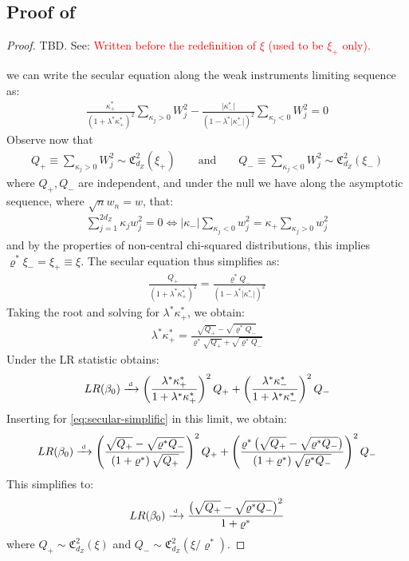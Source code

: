 \subsection{Proof of}
\begin{proof}
    TBD. See: \textcolor{red}{Written before the redefinition of \(\xi\) (used to be \(\xi_+\) only). }

    we can write the secular equation along the weak instruments limiting sequence as:
\begin{align*}
    \frac{ \kappa_+^* }{(1+\lambda^*\kappa^*_+)^2}\sum_{\kappa_j>0}W_{j}^2 
    -\frac{ \lvert\kappa_-^*\rvert }{(1-\lambda^*\lvert\kappa_-^*\rvert)^2}\sum_{\kappa_j<0}W_{j}^2  = 0
\end{align*}
Observe now that
\begin{align}
    Q_+ \equiv \sum_{\kappa_j>0}W_j^2 \sim \mathfrak{C}^2_{d_Z}(\xi_+)
    \qquad \text{and}
    \qquad 
    Q_- \equiv \sum_{\kappa_j<0}W_j^2 \sim \mathfrak{C}^2_{d_Z}(\xi_-)
\end{align}
where \(Q_+,Q_-\) are independent, and under the null we have along the asymptotic sequence, where \(\sqrt{n}w_n=w\), that:
\begin{align*}
    \sum_{j=1}^{2d_Z}\kappa_jw_j^2 = 0
    \iff
        \lvert\kappa_-\rvert\sum_{\kappa_j<0}w_j^2 = \kappa_+\sum_{\kappa_j>0}w_j^2
\end{align*}
and by the properties of non-central chi-squared distributions, this implies \(\varrho^*\xi_- = \xi_+ \equiv \xi\).
The secular equation thus simplifies as:
\begin{align*}
    \frac{ Q_+ }{(1+\lambda^*\kappa^*_+)^2}
     = \frac{ \varrho^* Q_- }{(1-\lambda^*\lvert\kappa_-^*\rvert)^2} 
\end{align*}
Taking the root and solving for \(\lambda^*\kappa_+^*\), we obtain:
\begin{align*}
\lambda^*\kappa_+^* = 
    \frac{ \sqrt{Q_+}-\sqrt{\varrho^*Q_-}}{\varrho^*\sqrt{Q_+} + \sqrt{\varrho^*Q_-}}
    \label{eq:secular-simplific}
\end{align*}
Under  the LR statistic obtains:
\begin{align*}
    LR(\beta_0) \xrightarrow{{\scriptscriptstyle \mathrm{\;d\;}}} 
     \left(\frac{\lambda^*  \kappa^*_+}{1+\lambda^* \kappa^*_+}\right)^2Q_++\left(\frac{\lambda^*  \kappa^*_-}{1+\lambda^* \kappa^*_-}\right)^2Q_- 
\end{align*}
Inserting for \cref{eq:secular-simplific} in this limit, we obtain:
\begin{align*}
    LR(\beta_0) \xrightarrow{{\scriptscriptstyle \mathrm{\;d\;}}} 
     \left(\frac{\sqrt{Q_+}-\sqrt{\varrho^* Q_-}}{\left(1+\varrho^*\right) \sqrt{Q_+}}\right)^2 Q_+
     +\left(\frac{\varrho^*\left(\sqrt{Q_+}-\sqrt{\varrho^* Q_-}\right)}{\left(1+\varrho^*\right) \sqrt{\varrho^* Q_-}}\right)^2 Q_-
\end{align*}
This simplifies to:
\begin{align}
    LR(\beta_0) \xrightarrow{{\scriptscriptstyle \mathrm{\;d\;}}} 
    \frac{\left(\sqrt{Q_+}-\sqrt{\varrho^* Q_-}\right)^2}{1+\varrho^*}
\end{align}
where \(Q_+ \sim \mathfrak{C}^2_{d_Z}(\xi)\) and \(Q_- \sim \mathfrak{C}^2_{d_Z}(\xi/\varrho^*)\).
\end{proof}

